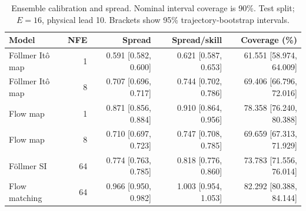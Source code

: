 \begin{table}[t]
\centering
\small
\setlength{\tabcolsep}{3pt}
\caption{Ensemble calibration and spread. Nominal interval coverage is 90\%. Test split; $E=16$, physical lead 10. Brackets show 95\% trajectory-bootstrap intervals.}
\label{tab:map-calibration}
\begin{tabular}{lrrrr}
\toprule
Model & NFE & Spread & Spread/skill & Coverage (\%) \\
\midrule
Föllmer Itô map & 1 & 0.591 [0.582, 0.600] & 0.621 [0.587, 0.653] & 61.551 [58.974, 64.009] \\
Föllmer Itô map & 8 & 0.707 [0.696, 0.717] & 0.744 [0.702, 0.786] & 69.406 [66.796, 72.016] \\
\addlinespace
Flow map & 1 & 0.871 [0.856, 0.884] & 0.910 [0.864, 0.956] & 78.358 [76.240, 80.388] \\
Flow map & 8 & 0.710 [0.697, 0.723] & 0.747 [0.708, 0.785] & 69.659 [67.313, 71.929] \\
\addlinespace
Föllmer SI & 64 & 0.774 [0.763, 0.785] & 0.818 [0.776, 0.860] & 73.783 [71.556, 76.014] \\
\addlinespace
Flow matching & 64 & 0.966 [0.950, 0.982] & 1.003 [0.954, 1.053] & 82.292 [80.388, 84.144] \\
\bottomrule
\end{tabular}
\end{table}
